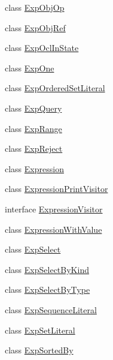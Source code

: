 \begin{DoxyCompactItemize}
\item 
class \hyperlink{classorg_1_1tzi_1_1use_1_1uml_1_1ocl_1_1expr_1_1_exp_obj_op}{Exp\-Obj\-Op}
\item 
class \hyperlink{classorg_1_1tzi_1_1use_1_1uml_1_1ocl_1_1expr_1_1_exp_obj_ref}{Exp\-Obj\-Ref}
\item 
class \hyperlink{classorg_1_1tzi_1_1use_1_1uml_1_1ocl_1_1expr_1_1_exp_ocl_in_state}{Exp\-Ocl\-In\-State}
\item 
class \hyperlink{classorg_1_1tzi_1_1use_1_1uml_1_1ocl_1_1expr_1_1_exp_one}{Exp\-One}
\item 
class \hyperlink{classorg_1_1tzi_1_1use_1_1uml_1_1ocl_1_1expr_1_1_exp_ordered_set_literal}{Exp\-Ordered\-Set\-Literal}
\item 
class \hyperlink{classorg_1_1tzi_1_1use_1_1uml_1_1ocl_1_1expr_1_1_exp_query}{Exp\-Query}
\item 
class \hyperlink{classorg_1_1tzi_1_1use_1_1uml_1_1ocl_1_1expr_1_1_exp_range}{Exp\-Range}
\item 
class \hyperlink{classorg_1_1tzi_1_1use_1_1uml_1_1ocl_1_1expr_1_1_exp_reject}{Exp\-Reject}
\item 
class \hyperlink{classorg_1_1tzi_1_1use_1_1uml_1_1ocl_1_1expr_1_1_expression}{Expression}
\item 
class \hyperlink{classorg_1_1tzi_1_1use_1_1uml_1_1ocl_1_1expr_1_1_expression_print_visitor}{Expression\-Print\-Visitor}
\item 
interface \hyperlink{interfaceorg_1_1tzi_1_1use_1_1uml_1_1ocl_1_1expr_1_1_expression_visitor}{Expression\-Visitor}
\item 
class \hyperlink{classorg_1_1tzi_1_1use_1_1uml_1_1ocl_1_1expr_1_1_expression_with_value}{Expression\-With\-Value}
\item 
class \hyperlink{classorg_1_1tzi_1_1use_1_1uml_1_1ocl_1_1expr_1_1_exp_select}{Exp\-Select}
\item 
class \hyperlink{classorg_1_1tzi_1_1use_1_1uml_1_1ocl_1_1expr_1_1_exp_select_by_kind}{Exp\-Select\-By\-Kind}
\item 
class \hyperlink{classorg_1_1tzi_1_1use_1_1uml_1_1ocl_1_1expr_1_1_exp_select_by_type}{Exp\-Select\-By\-Type}
\item 
class \hyperlink{classorg_1_1tzi_1_1use_1_1uml_1_1ocl_1_1expr_1_1_exp_sequence_literal}{Exp\-Sequence\-Literal}
\item 
class \hyperlink{classorg_1_1tzi_1_1use_1_1uml_1_1ocl_1_1expr_1_1_exp_set_literal}{Exp\-Set\-Literal}
\item 
class \hyperlink{classorg_1_1tzi_1_1use_1_1uml_1_1ocl_1_1expr_1_1_exp_sorted_by}{Exp\-Sorted\-By}

\end{DoxyCompactItemize}

